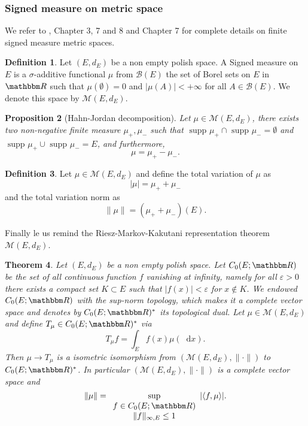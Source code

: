 \documentclass[a4paper,11pt, reqno]{amsart}
\newcommand{\cB}{\mathcal{B}}	\newcommand{\BB}{\mathbbm{B}}
\newcommand{\cM}{\mathcal{M}}	\newcommand{\MM}{\mathbbm{M}}
\newcommand{\eps}{\varepsilon}
\newcommand{\dd}{\mathop{}\!\mathrm{d}}
\newcommand{\1}{\mathbbm{1}}
\theoremstyle{plain}
\newtheorem{theorem}{Theorem}[section]
\newtheorem{proposition}[theorem]{Proposition}
\theoremstyle{definition}
\newtheorem{definition}[theorem]{Definition}
\begin{document}
\subsubsection{Signed measure on metric space}

We refer to {\cite{bogachevMeasureTheory2007}}, Chapter 3, 7 and 8 and
{\cite{follandRealAnalysisModern2007}} Chapter 7 for complete details on
finite signed measure metric spaces.

\begin{definition}
  Let $(E, d_E)$ be a non empty polish space. A Signed measure on $E$ is a
  $\sigma$-additive functional $\mu$ from $\cB (E)$ the set of Borel
  sets on $E$ in $\RR$ such that $\mu (\emptyset) = 0$ and $| \mu (A) |
  < + \infty$ for all $A \in \cB (E)$. We denote this space by
  $\cM (E, d_E)$.
\end{definition}

\begin{proposition}[Hahn-Jordan decomposition]\label{prop:hahn-jordan}
  Let $\mu \in \cM (E, d_E)$, there exists two non-negative finite
  measure $\mu_+, \mu_-$ such that $ \text{ supp } \mu_+ \cap  \text{ supp } \mu_- =
  \emptyset$ and $ \text{ supp } \mu_+ \cup  \text{ supp } \mu_- = E$, and
  furthermore,
  \[ \mu = \mu_+ - \mu_- . \]
\end{proposition}

\begin{definition}
  Let $\mu \in \cM (E, d_E)$ and define the total variation of $\mu$
  as
  \[ | \mu | = \mu_+ + \mu_- \]
  and the total variation norm as
  \[ \| \mu \| = (\mu_+ + \mu_-) (E) . \]
\end{definition}

Finally le us remind the Riesz-Markov-Kakutani representation theorem
$\cM (E, d_E)$.

\begin{theorem}\label{theorem:M-as-topologocal-dual}
  Let $(E, d_E)$ be a non empty polish space. Let $C_0 (E ; \RR)$ be
  the set of all continuous function $f$ vanishing at infinity, namely for all
  $\eps > 0$ there exists a compact set $K \subset E$ such that $| f
  (x) | < \eps$ for $x \notin K$. We endowed $C_0 (E ; \RR)$
  with the sup-norm topology, which makes it a complete vector space and
  denotes by $C_0 (E ; \RR)^{\ast}$ its topological dual. Let $\mu \in
  \cM (E, d_E)$ and define $T_{\mu} \in C_0 (E ; \RR)^{\ast}$
  via
  \[ T_{\mu} f = \int_E f (x) \mu (\dd x) . \]
  Then $\mu \rightarrow T_{\mu}$ is a isometric isomorphism from $(\cM
  (E, d_E), \| \cdot \|)$ to $C_0 (E ; \RR)^{\ast}$. In particular
  $(\cM (E, d_E), \| \cdot \|)$ is a complete vector space and
  \[ \| \mu \| = \underset{\begin{array}{c}
       f \in C_0 (E ; \RR)\\
       \| f \|_{\infty, E} \le 1
     \end{array}}{\sup} | \langle f, \mu \rangle | . \]
\end{theorem}
\end{document}
